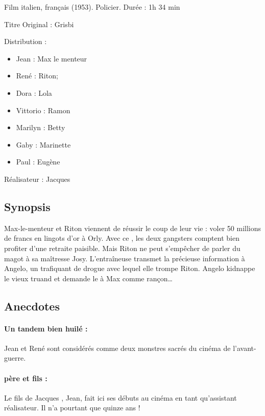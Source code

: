 Film italien, français (1953). Policier. Durée : 1h 34 min

Titre Original : Grisbi

Distribution :

\begin{itemize}
	\item Jean  : Max le menteur	
	\item René  : Riton;
	\item Dora  : Lola	
	\item Vittorio  : Ramon	
	\item Marilyn  : Betty	
	\item Gaby  : Marinette	
	\item Paul  : Eugène
\end{itemize}

Réalisateur : Jacques 


\subsection*{Synopsis}

Max-le-menteur et Riton viennent de réussir le coup de leur vie : voler 50
millions de francs en lingots d'or à Orly. Avec ce , les deux
gangsters comptent bien profiter d'une retraite paisible. Mais Riton ne peut
s'empêcher de parler du magot à sa maîtresse Josy. L'entraîneuse transmet la
précieuse information à Angelo, un trafiquant de drogue avec lequel elle trompe Riton. Angelo kidnappe le vieux truand et demande le  à Max comme rançon\dots


\subsection*{Anecdotes}

\paragraph{Un tandem bien huilé :} Jean  et René 
 sont considérés comme deux monstres sacrés du cinéma de
l'avant-guerre.

\paragraph{ père et fils :} Le fils de Jacques 
, Jean, fait ici ses débuts au cinéma en tant qu'assistant
réalisateur. Il n'a pourtant que quinze ans !


